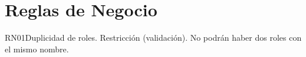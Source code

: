 \section{Reglas de Negocio}

\begin{BussinesRule}{RN01}{Duplicidad de roles.} 
	\BRitem[Tipo:] Restricción (validación).
	\BRitem[Descripción:]No podrán haber dos roles con el mismo nombre.
\end{BussinesRule}


